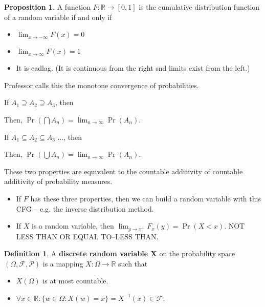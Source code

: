 \documentclass{article}
\theoremstyle{definition}
\newtheorem{definition}{Definition}
\newtheorem{proposition}{Proposition}[theorem]
\newcommand{\R}{\mathbb{R}}
\newcommand{\Prob}{\mathcal{P}}
\begin{document}
\begin{proposition}
    A function $F: \R \xrightarrow{} [0,1]$ is the cumulative distribution
    function of a random variable if and only if
    
    \begin{itemize}
        \item $\lim_{x \to -\infty} F(x) = 0$
        \item $\lim_{x \to \infty} F(x) = 1$
        \item It is cadlag. (It is continuous from the right snd limits exist from the left.)
    \end{itemize}
\end{proposition}

Professor calls this the monotone convergence of probabilities. 

If $A_{1} \supseteq A_{2} \supseteq A_{3}$, then

Then, $\Pr(\bigcap A_{n}) = \lim_{n \to \infty} \Pr(A_{n})$.

If $A_{1} \subseteq A_{2} \subseteq A_{3}$ ..., then

Then, $\Pr(\bigcup A_{n}) = \lim_{n \to \infty} \Pr(A_{n})$.

These two properties are equivalent to the countable additivity of countable additivity of probability measures.

\begin{itemize}
    \item If $F$ has these three properties, then we can build a random variable
    with this CFG -- e.g. the inverse distribution method.
    \item If $X$ is a random variable, then $\lim_{y \to x^{-}} F_{x}(y) = \Pr(X < x)$.
    NOT LESS THAN OR EQUAL TO--LESS THAN.
\end{itemize}

\newpage

\begin{definition}
    A \textbf{discrete random variable X} on the probability space $(\Omega, \mathcal{F}, \Prob)$
    is a mapping $X: \Omega \xrightarrow{} \R$ such that

    \begin{itemize}
        \item $X(\Omega)$ is at most countable.
        \item $\forall x \in \R: \{w \in \Omega: X(w) = x\} = X^{-1}(x) \in \mathcal{F}$.
    \end{itemize}
\end{definition}
\end{document}
